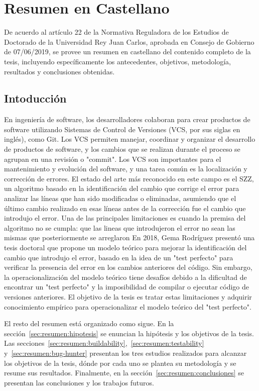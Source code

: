 \chapter{Resumen en Castellano}

De acuerdo al artículo 22 de la Normativa Reguladora de los Estudios de Doctorado de la Universidad Rey Juan Carlos, aprobada en Consejo de Gobierno de 07/06/2019, se provee un resumen en castellano del contenido completo de la tesis, incluyendo específicamente los antecedentes, objetivos, metodología, resultados y conclusiones obtenidas.

\section{Intoducción}

En ingeniería de software, los desarrolladores colaboran para crear productos de software utilizando Sistemas de Control de Versiones (VCS, por sus siglas en inglés), como Git. 
Los VCS permiten manejar, coordinar y organizar el desarrollo de productos de software, y los cambios que se realizan durante el proceso se agrupan en una revisión o "commit". 
Los VCS son importantes para el mantenimiento y evolución del software, y una tarea común es la localización y corrección de errores. 
El estado del arte más reconocido en este campo es el SZZ, un algoritmo basado en la identificación del cambio que corrige el error para analizar las líneas que han sido modificadas o eliminadas, asumiendo que el último cambio realizado en esas líneas antes de la corrección fue el cambio que introdujo el error. 
Una de las principales limitaciones es cuando la premisa del algoritmo no se cumpla: que las lineas que introdujeron el error no sean
las mismas que posteriormente se arreglaron
En 2018, Gema Rodríguez presentó una tesis doctoral que propone un modelo teórico para mejorar la identificación del cambio que introdujo el error, basado en la idea de un "test perfecto" para verificar la presencia del error en los cambios anteriores del código. 
Sin embargo, la operacionalización del modelo teórico tiene desafíos debido a la dificultad de encontrar un "test perfecto" y la imposibilidad de compilar o ejecutar código de versiones anteriores. 
El objetivo de la tesis es tratar estas limitaciones y adquirir conocimiento empírico para operacionalizar el modelo teórico del "test perfecto".

El resto del resumen está organizado como sigue. En la sección~\ref{sec:resumen:hipotesis} se enuncian la hipótesis y los objetivos de la tesis. 
Las secciones~\ref{sec:resumen:buildability},~\ref{sec:resumen:testability} y~\ref{sec:resumen:bug-hunter} presentan los tres estudios realizados para alcanzar los objetivos de la tesis, dónde por cada uno se plantea su metodología y se resume sus resultados.
Finalmente, en la sección~\ref{sec:resumen:conclusiones} se presentan las conclusiones y los trabajos futuros. 

